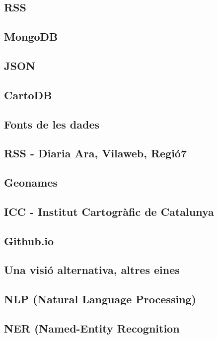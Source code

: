 \documentclass[12pt,a4paper,openright,oneside]{article}
\numberwithin{equation}{section}
\theoremstyle{definition}
\begin{document}
\subsection*{RSS}

\subsection*{MongoDB}

\subsection*{JSON}

\subsection*{CartoDB}

\subsection{Fonts de les dades}

\subsection*{RSS - Diaria Ara, Vilaweb, Regió7}

\subsection*{Geonames}

\subsection*{ICC - Institut Cartogràfic de Catalunya}

\subsection*{Github.io}

\subsection{Una visió alternativa, altres eines}

\subsection*{NLP (Natural Language Processing)}

\subsection*{NER (Named-Entity Recognition}
\end{document}
